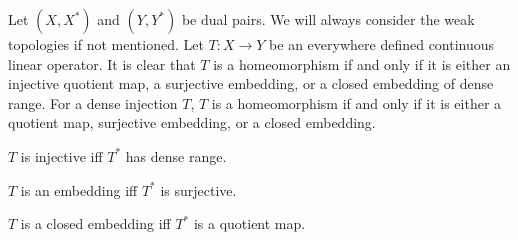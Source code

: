 \documentclass{../../large}
\begin{document}
\begin{prb}
Let $(X,X^*)$ and $(Y,Y^*)$ be dual pairs.
We will always consider the weak topologies if not mentioned.
Let $T:X\to Y$ be an everywhere defined continuous linear operator.
It is clear that $T$ is a homeomorphism if and only if it is either an injective quotient map, a surjective embedding, or a closed embedding of dense range.
For a dense injection $T$, $T$ is a homeomorphism if and only if it is either a quotient map, surjective embedding, or a closed embedding.
\begin{parts}
\item $T$ is injective iff $T^*$ has dense range.
\item $T$ is an embedding iff $T^*$ is surjective.
\item $T$ is a closed embedding iff $T^*$ is a quotient map.
\end{parts}
\end{prb}
\end{document}
